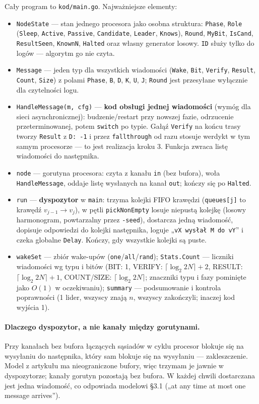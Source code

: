 \documentclass[11pt,a4paper]{article}
\theoremstyle{definition}
\newcommand{\msg}[1]{\textsf{\small #1}}
\newcommand{\fn}[1]{\texttt{#1}}
\begin{document}
Cały program to \fn{kod/main.go}. Najważniejsze elementy:
\begin{itemize}
\item \fn{NodeState} — stan jednego procesora jako osobna struktura: \fn{Phase}, \fn{Role}
  (\fn{Sleep}, \fn{Active}, \fn{Passive}, \fn{Candidate}, \fn{Leader}, \fn{Knows}), \fn{Round},
  \fn{MyBit}, \fn{IsCand}, \fn{ResultSeen}, \fn{KnownN}, \fn{Halted} oraz własny generator losowy.
  \fn{ID} służy tylko do logów — algorytm go nie czyta.
\item \fn{Message} — jeden typ dla wszystkich wiadomości (\fn{Wake}, \fn{Bit}, \fn{Verify},
  \fn{Result}, \fn{Count}, \fn{Size}) z polami \fn{Phase}, \fn{B}, \fn{D}, \fn{K}, \fn{U}, \fn{J};
  \fn{Round} jest przesyłane wyłącznie dla czytelności logu.
\item \fn{HandleMessage(m, cfg)} — \textbf{kod obsługi jednej wiadomości} (wymóg dla sieci
  asynchronicznej): budzenie/restart przy nowszej fazie, odrzucenie przeterminowanej, potem
  \fn{switch} po typie. Gałąź \fn{Verify} na końcu trasy tworzy \fn{Result} z \fn{D:~-1} i przez
  \fn{fallthrough} od razu stosuje werdykt w tym samym procesorze — to jest realizacja kroku 3.
  Funkcja zwraca listę wiadomości do następnika.
\item \fn{node} — gorutyna procesora: czyta z kanału \fn{in} (bez bufora), woła \fn{HandleMessage},
  oddaje listę wysłanych na kanał \fn{out}; kończy się po \fn{Halted}.
\item \fn{run} — \textbf{dyspozytor} w \fn{main}: trzyma kolejki FIFO krawędzi (\fn{queues[j]} to
  krawędź $v_{j-1}\to v_j$), w pętli \fn{pickNonEmpty} losuje niepustą kolejkę (losowy harmonogram,
  powtarzalny przez \fn{-seed}), dostarcza jedną wiadomość, dopisuje odpowiedzi do kolejki następnika,
  loguje „\texttt{vX wysłał M do vY}” i czeka globalne \fn{Delay}. Kończy, gdy wszystkie kolejki są puste.
\item \fn{wakeSet} — zbiór wake-upów (\fn{one}/\fn{all}/\fn{rand}); \fn{Stats.Count} — liczniki
  wiadomości wg typu i bitów (\msg{BIT}: 1, \msg{VERIFY}: $\lceil\log_2 2N\rceil+2$, \msg{RESULT}:
  $\lceil\log_2 2N\rceil+1$, \msg{COUNT}/\msg{SIZE}: $\lceil\log_2 2N\rceil$; znaczniki typu i fazy
  pominięte jako $O(1)$ w oczekiwaniu); \fn{summary} — podsumowanie i kontrola poprawności
  (1 lider, wszyscy znają $n$, wszyscy zakończyli; inaczej kod wyjścia 1).
\end{itemize}

\paragraph{Dlaczego dyspozytor, a nie kanały między gorutynami.} Przy kanałach bez bufora
łączących sąsiadów w cyklu procesor blokuje się na wysyłaniu do następnika, który sam blokuje się na
wysyłaniu — zakleszczenie. Model z artykułu ma nieograniczone bufory, więc trzymam je jawnie
w dyspozytorze; kanały gorutyn pozostają bez bufora. W każdej chwili dostarczana jest jedna wiadomość, co
odpowiada modelowi §3.1 („at any time at most one message arrives”).
\end{document}

